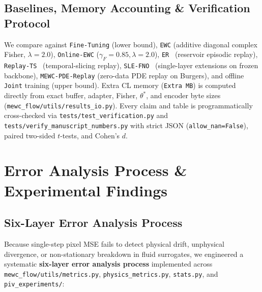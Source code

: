 \documentclass[11pt,a4paper]{article}
\begin{document}
\subsection{Baselines, Memory Accounting \& Verification Protocol}

We compare against \texttt{Fine-Tuning} (lower bound), \texttt{EWC} (additive diagonal complex Fisher, $\lambda = 2.0$), \texttt{Online-EWC} ($\gamma_F = 0.85, \lambda = 2.0$), \texttt{ER}~\cite{rolnick2019er} (reservoir episodic replay), \texttt{Replay-TS}~\cite{hemati2026replayts} (temporal-slicing replay), \texttt{SLE-FNO}~\cite{elhadidy2026slefno} (single-layer extensions on frozen backbone), \texttt{MEWC-PDE-Replay} (zero-data PDE replay on Burgers), and offline \texttt{Joint} training (upper bound). Extra CL memory (\texttt{Extra MB}) is computed directly from exact buffer, adapter, Fisher, $\theta^*$, and encoder byte sizes (\texttt{mewc\_flow/utils/results\_io.py}). Every claim and table is programmatically cross-checked via \texttt{tests/test\_verification.py} and \texttt{tests/verify\_manuscript\_numbers.py} with strict JSON (\texttt{allow\_nan=False}), paired two-sided $t$-tests, and Cohen's $d$.

\section{Error Analysis Process \& Experimental Findings}

\subsection{Six-Layer Error Analysis Process}

Because single-step pixel MSE fails to detect physical drift, unphysical divergence, or non-stationary breakdown in fluid surrogates, we engineered a systematic \textbf{six-layer error analysis process} implemented across \texttt{mewc\_flow/utils/metrics.py}, \texttt{physics\_metrics.py}, \texttt{stats.py}, and \texttt{piv\_experiments/}:
\end{document}
